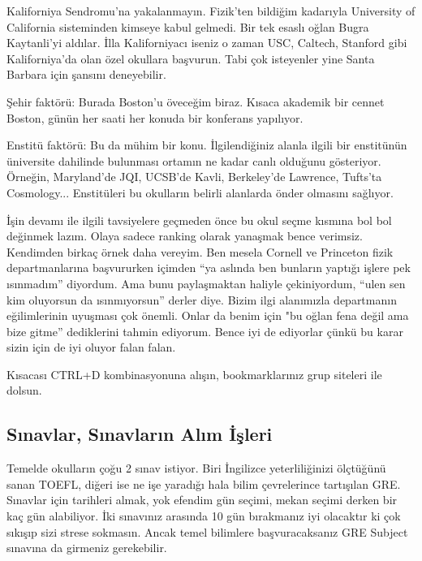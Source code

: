 \documentclass[12pt,a4paper]{article}
\begin{document}
Kaliforniya Sendromu'na yakalanmayın. Fizik'ten bildiğim kadarıyla University of California sisteminden kimseye kabul gelmedi. Bir tek esaslı oğlan Bugra Kaytanli'yi aldılar. İlla Kaliforniyacı iseniz o zaman USC, Caltech, Stanford gibi Kaliforniya'da olan özel okullara başvurun. Tabi çok isteyenler yine Santa Barbara için şansını deneyebilir. 

Şehir faktörü: Burada Boston'u öveceğim biraz. Kısaca akademik bir cennet Boston, günün her saati her konuda bir konferans yapılıyor. 

Enstitü faktörü: Bu da mühim bir konu. İlgilendiğiniz alanla ilgili bir enstitünün üniversite dahilinde bulunması ortamın ne kadar canlı olduğunu gösteriyor. Örneğin, Maryland'de JQI, UCSB'de Kavli, Berkeley'de Lawrence, Tufts'ta Cosmology... Enstitüleri bu okulların belirli alanlarda önder olmasını sağlıyor. 

İşin devamı ile ilgili tavsiyelere geçmeden önce bu okul seçme kısmına bol bol değinmek lazım. Olaya sadece ranking olarak yanaşmak bence verimsiz. Kendimden birkaç örnek daha vereyim.  
Ben mesela Cornell ve Princeton fizik departmanlarına başvururken içimden ``ya aslında ben bunların yaptığı işlere pek ısınmadım'' diyordum. Ama bunu paylaşmaktan haliyle çekiniyordum, “ulen sen kim oluyorsun da ısınmıyorsun” derler diye. Bizim ilgi alanımızla departmanın eğilimlerinin uyuşması çok önemli. Onlar da benim için "bu oğlan fena değil ama bize gitme'' dediklerini tahmin ediyorum. Bence iyi de ediyorlar çünkü bu karar sizin için de iyi oluyor falan falan. 

Kısacası CTRL+D kombinasyonuna alışın, bookmarklarınız grup siteleri ile dolsun.  

\subsection{Sınavlar, Sınavların Alım İşleri}
Temelde okulların çoğu 2 sınav istiyor. Biri İngilizce yeterliliğinizi ölçtüğünü sanan TOEFL, diğeri ise ne işe yaradığı hala bilim çevrelerince tartışılan GRE. Sınavlar için tarihleri almak, yok efendim gün seçimi, mekan seçimi derken bir kaç gün alabiliyor. İki sınavınız arasında 10 gün bırakmanız iyi olacaktır ki çok sıkışıp sizi strese sokmasın. Ancak temel bilimlere başvuracaksanız GRE Subject sınavına da girmeniz gerekebilir. 
\end{document}
